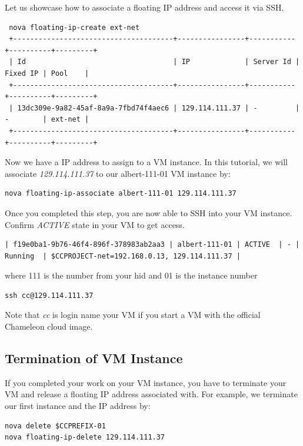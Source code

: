 Let us showcase how to associate a floating IP address and access it
via SSH.

\begin{tiny}
\begin{lstlisting}
 nova floating-ip-create ext-net
 +--------------------------------------+----------------+-----------+----------+---------+
 | Id                                   | IP             | Server Id | Fixed IP | Pool    |
 +--------------------------------------+----------------+-----------+----------+---------+
 | 13dc309e-9a82-45af-8a9a-7fbd74f4aec6 | 129.114.111.37 | -         | -        | ext-net |
 +--------------------------------------+----------------+-----------+----------+---------+
\end{lstlisting}
\end{tiny}

Now we have a IP address to assign to a VM instance. In this tutorial,
we will associate \textit{129.114.111.37} to our
albert-111-01 VM instance by:

\begin{lstlisting}
nova floating-ip-associate albert-111-01 129.114.111.37
\end{lstlisting}

Once you completed this step, you are now able to SSH into your VM
instance.  Confirm \textit{ACTIVE} state in your VM to get access.

\begin{tiny}
\begin{lstlisting}
| f19e0ba1-9b76-46f4-896f-378983ab2aa3 | albert-111-01 | ACTIVE  | - | Running  | $CCPROJECT-net=192.168.0.13, 129.114.111.37 |
\end{lstlisting}
\end{tiny}

where 111 is the number from your hid and 01 is the instance number

\begin{lstlisting}
ssh cc@129.114.111.37
\end{lstlisting}

Note that \textit{cc} is login name your VM if you start a VM
with the official Chameleon cloud image.

\subsection{Termination of VM Instance}

If you completed your work on your VM instance, you have to terminate
your VM and release a floating IP address associated with. For
example, we terminate our first instance and the IP address by:

\begin{lstlisting}
nova delete $CCPREFIX-01
nova floating-ip-delete 129.114.111.37
\end{lstlisting}

